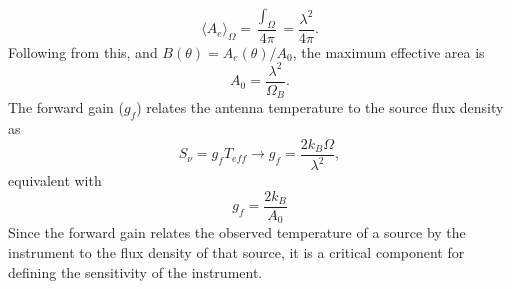 \begin{equation*}
\langle A_e\rangle_\Omega=\frac{\int_\Omega}{4\pi}=\frac{\lambda^2}{4\pi}.
\end{equation*}
Following from this, and $B(\theta)=A_e(\theta)/A_0$,
the maximum effective area is 
\begin{equation}
    A_0=\frac{\lambda^2}{\Omega_B}.\label{eq:Ae}
\end{equation}
The forward gain ($g_f$) relates the antenna temperature to the source flux density as
\begin{equation*}
S_\nu=g_f T_{eff} \to g_f=\frac{2k_B\Omega}{\lambda^2},\label{eq:FDFG}
\end{equation*}
equivalent with
\begin{equation}
    g_f=\frac{2k_B}{A_0}\label{eq:FG}
\end{equation}
Since the forward gain relates the observed temperature of a source by the instrument to the flux density of that source, it is a critical component for defining the sensitivity of the instrument. 

